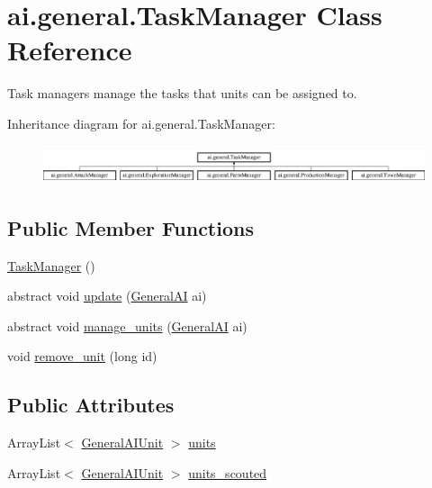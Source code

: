 \hypertarget{classai_1_1general_1_1_task_manager}{
\section{ai.general.TaskManager Class Reference}
\label{classai_1_1general_1_1_task_manager}
}


Task managers manage the tasks that units can be assigned to.  


Inheritance diagram for ai.general.TaskManager:\begin{figure}[H]
\begin{center}
\leavevmode
\includegraphics[height=1.148718cm]{classai_1_1general_1_1_task_manager}
\end{center}
\end{figure}
\subsection*{Public Member Functions}
\begin{DoxyCompactItemize}
\item 
\hyperlink{classai_1_1general_1_1_task_manager_a1c9d8d6ee16bceb7620d2eb80d831527}{TaskManager} ()
\item 
abstract void \hyperlink{classai_1_1general_1_1_task_manager_a4da499b96f85de75adadafdd4a764c68}{update} (\hyperlink{classai_1_1general_1_1_general_a_i}{GeneralAI} ai)
\item 
abstract void \hyperlink{classai_1_1general_1_1_task_manager_a0dc28110d6f757df002ae58667f41fb7}{manage\_\-units} (\hyperlink{classai_1_1general_1_1_general_a_i}{GeneralAI} ai)
\item 
void \hyperlink{classai_1_1general_1_1_task_manager_ae8545f8cf4ca068ce39cfcc3242af5b9}{remove\_\-unit} (long id)
\end{DoxyCompactItemize}
\subsection*{Public Attributes}
\begin{DoxyCompactItemize}
\item 
ArrayList$<$ \hyperlink{classai_1_1general_1_1_general_a_i_unit}{GeneralAIUnit} $>$ \hyperlink{classai_1_1general_1_1_task_manager_af1f1456711a8fae38008a1f257499a40}{units}
\item 
ArrayList$<$ \hyperlink{classai_1_1general_1_1_general_a_i_unit}{GeneralAIUnit} $>$ \hyperlink{classai_1_1general_1_1_task_manager_ab60f349ac3875cfa72322c09a318dfd1}{units\_\-scouted}
\end{DoxyCompactItemize}


